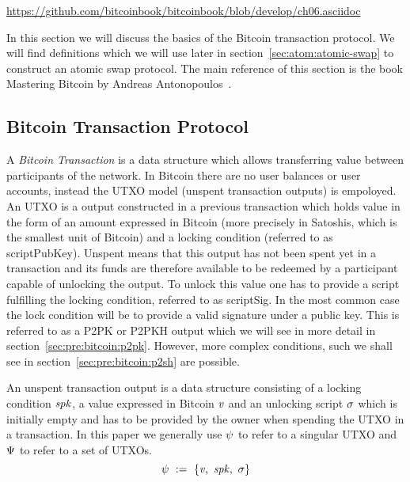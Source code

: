 \urldef\urlbtcbook\url{https://github.com/bitcoinbook/bitcoinbook/blob/develop/ch06.asciidoc}

In this section we will discuss the basics of the Bitcoin transaction protocol.
We will find definitions which we will use later in section~\ref{sec:atom:atomic-swap} to construct an atomic swap protocol.
The main reference of this section is the book Mastering Bitcoin by Andreas Antonopoulos~\cite{antonopoulos2014mastering}.

\subsection{Bitcoin Transaction Protocol}\label{subsec:pre:bitcointx}

A \emph{Bitcoin Transaction} is a data structure which allows transferring value between participants of the network.
In Bitcoin there are no user balances or user accounts, instead the UTXO model (unspent transaction outputs) is empoloyed.
An UTXO is a output constructed in a previous transaction which holds value in the form of an amount expressed in
Bitcoin (more precisely in Satoshis, which is the smallest unit of Bitcoin) and a locking condition (referred to as
scriptPubKey).
Unspent means that this output has not been spent yet in a transaction and its funds are therefore available to be redeemed by a participant capable of unlocking the output.
To unlock this value one has to provide a script fulfilling the locking condition, referred to as scriptSig.
In the most common case the lock condition will be to provide a valid signature under a public key.
This is referred to as a P2PK or P2PKH output which we will see in more detail in section~\ref{sec:pre:bitcoin:p2pk}.
However, more complex conditions, such we shall see in section~\ref{sec:pre:bitcoin:p2sh} are possible.

\begin{definition} An unspent transaction output is a data structure
consisting of a locking condition $\mathit{spk}$, a value expressed in Bitcoin $\mathit{v}$ and an unlocking script $\mathit{\sigma}$ which is
initially empty and has to be provided by the owner when spending the UTXO in a transaction. In this paper we
generally use $\psi$ to refer to a singular UTXO and $\Psi$ to refer to a set of UTXOs.
    \[ \psi ~:=~ \{ \mathit{v} ,~ \mathit{spk} ,~ \mathit{\sigma} \} \]
\end{definition}

